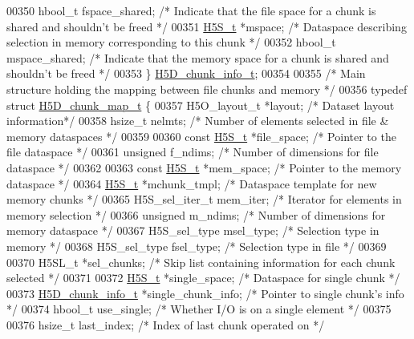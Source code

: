 \begin{DoxyCode}
00350     hbool\_t fspace\_shared;      \textcolor{comment}{/* Indicate that the file space for a chunk is shared and shouldn't be
       freed */}
00351     \hyperlink{struct_h5_s__t}{H5S\_t} *mspace;              \textcolor{comment}{/* Dataspace describing selection in memory corresponding to this
       chunk */}
00352     hbool\_t mspace\_shared;      \textcolor{comment}{/* Indicate that the memory space for a chunk is shared and shouldn't be
       freed */}
00353 \} \hyperlink{struct_h5_d__chunk__info__t}{H5D\_chunk\_info\_t};
00354 
00355 \textcolor{comment}{/* Main structure holding the mapping between file chunks and memory */}
00356 \textcolor{keyword}{typedef} \textcolor{keyword}{struct }\hyperlink{struct_h5_d__chunk__map__t}{H5D\_chunk\_map\_t} \{
00357     H5O\_layout\_t *layout;       \textcolor{comment}{/* Dataset layout information*/}
00358     hsize\_t nelmts;             \textcolor{comment}{/* Number of elements selected in file & memory dataspaces */}
00359 
00360     \textcolor{keyword}{const} \hyperlink{struct_h5_s__t}{H5S\_t} *file\_space;    \textcolor{comment}{/* Pointer to the file dataspace */}
00361     \textcolor{keywordtype}{unsigned} f\_ndims;           \textcolor{comment}{/* Number of dimensions for file dataspace */}
00362 
00363     \textcolor{keyword}{const} \hyperlink{struct_h5_s__t}{H5S\_t} *mem\_space;     \textcolor{comment}{/* Pointer to the memory dataspace */}
00364     \hyperlink{struct_h5_s__t}{H5S\_t} *mchunk\_tmpl;         \textcolor{comment}{/* Dataspace template for new memory chunks */}
00365     H5S\_sel\_iter\_t mem\_iter;    \textcolor{comment}{/* Iterator for elements in memory selection */}
00366     \textcolor{keywordtype}{unsigned} m\_ndims;           \textcolor{comment}{/* Number of dimensions for memory dataspace */}
00367     H5S\_sel\_type msel\_type;     \textcolor{comment}{/* Selection type in memory */}
00368     H5S\_sel\_type fsel\_type;     \textcolor{comment}{/* Selection type in file */}
00369 
00370     H5SL\_t *sel\_chunks;         \textcolor{comment}{/* Skip list containing information for each chunk selected */}
00371 
00372     \hyperlink{struct_h5_s__t}{H5S\_t}  *single\_space;       \textcolor{comment}{/* Dataspace for single chunk */}
00373     \hyperlink{struct_h5_d__chunk__info__t}{H5D\_chunk\_info\_t} *single\_chunk\_info;  \textcolor{comment}{/* Pointer to single chunk's info */}
00374     hbool\_t use\_single;         \textcolor{comment}{/* Whether I/O is on a single element */}
00375 
00376     hsize\_t last\_index;         \textcolor{comment}{/* Index of last chunk operated on */}

\end{DoxyCode}
